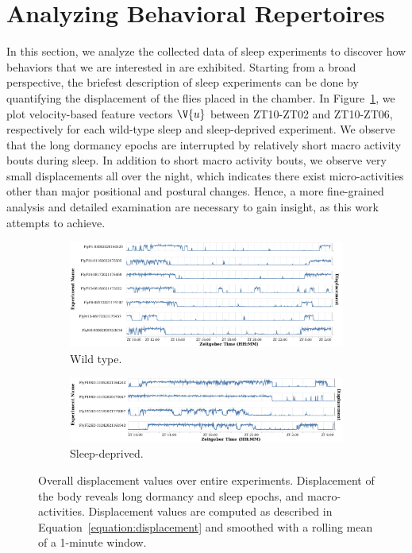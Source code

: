 \section{Analyzing Behavioral Repertoires}\label{section:analyzing-behavioral-repertoires}
In this section, we analyze the collected data of sleep experiments to discover how behaviors that we are interested in are exhibited.
Starting from a broad perspective, the briefest description of sleep experiments can be done by quantifying the displacement of the flies placed in the chamber.
In Figure~\ref{figure:displacement}, we plot velocity-based feature vectors $\V{u}$ between ZT10-ZT02 and ZT10-ZT06, respectively for each wild-type sleep and sleep-deprived experiment.
We observe that the long dormancy epochs are interrupted by relatively short macro activity bouts during sleep.
In addition to short macro activity bouts, we observe very small displacements all over the night, which indicates there exist micro-activities other than major positional and postural changes.
Hence, a more fine-grained analysis and detailed examination are necessary to gain insight, as this work attempts to achieve.

\begin{figure}[t!]
	\centering
	\begin{subfigure}[b]{0.95\linewidth}
		\centering\includegraphics[width=\linewidth]{figures/Velocity-WT-1T.pdf}
		\caption{Wild type.}
	\end{subfigure}%

	\begin{subfigure}[b]{0.95\linewidth}
		\centering\includegraphics[width=\linewidth]{figures/Velocity-SD-1T.pdf}
		\caption{Sleep-deprived.}
	\end{subfigure}%
	\caption[Overall displacement values over entire experiments.]{Overall displacement values over entire experiments.
		Displacement of the body reveals long dormancy and sleep epochs, and macro-activities.
		Displacement values are computed as described in Equation~\ref{equation:displacement} and smoothed with a rolling mean of a 1-minute window.\label{figure:displacement}}
\end{figure}

